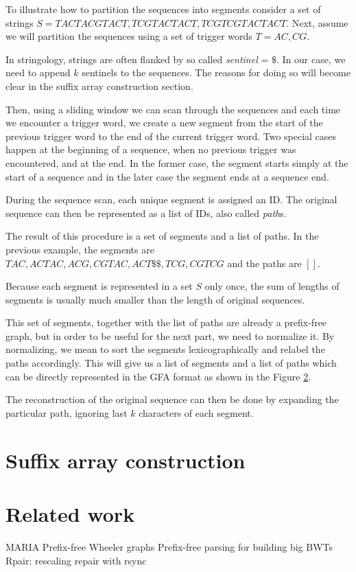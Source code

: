 \documentclass[twocolumn]{ceurart}
\begin{document}
To illustrate how to partition the sequences into segments consider a set of
strings $S = {TACTACGTACT, TCGTACTACT, TCGTCGTACTACT}$.
Next, assume we will partition the sequences using a set of trigger words 
$T = {AC, CG}$.

In stringology, strings are often flanked by so called \emph{sentinel} = $\$$.
In our case, we need to append $k$ sentinels to the sequences.
The reasons for doing so will become clear in the suffix array construction section.

Then, using a sliding window we can scan through the sequences and each time we
encounter a trigger word, we create a new segment from the start of the previous
trigger word to the end of the current trigger word.
Two special cases happen at the beginning of a sequence, when no previous
trigger was encountered, and at the end.
In the former case, the segment starts simply at the start of a sequence and in
the later case the segment ends at a sequence end.

During the sequence scan, each unique segment is assigned an ID.
The original sequence can then be represented as a list of IDs, also called 
\emph{path}s.

The result of this procedure is a set of segments and a list of paths.
In the previous example, the segments are ${ TAC, ACTAC, ACG, CGTAC, ACT\$\$, TCG, CGTCG }$
and the paths are $[  ]$.

Because each segment is represented in a set $S$ only once, the sum of lengths
of segments is usually much smaller than the length of original sequences.

This set of segments, together with the list of paths are already a prefix-free
graph, but in order to be useful for the next part, we need to normalize it.
By normalizing, we mean to sort the segments lexicographically and relabel the
paths accordingly.
This will give us a list of segments and a list of paths which can be directly
represented in the GFA format as shown in the Figure \ref{}.

The reconstruction of the original sequence can then be done by expanding 
the particular path, ignoring last $k$ characters of each segment.

\section{Suffix array construction}

\section{Related work}
MARIA \cite{2022maria}
Prefix-free Wheeler graphs \cite{2022pfwg}
Prefix-free parsing for building big BWTs \cite{2019boucher}
Rpair: rescaling repair with rsync \cite{2019gagie}
\end{document}
